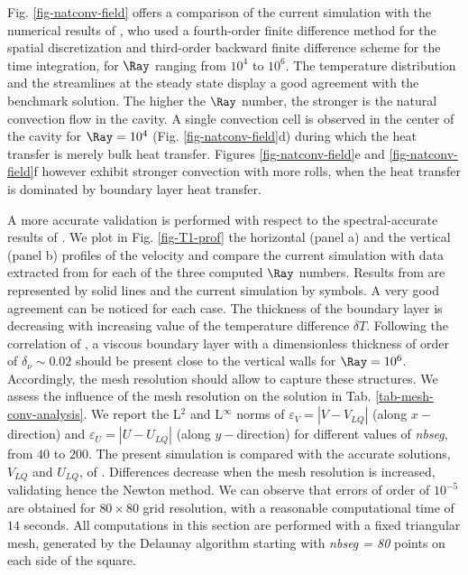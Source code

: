 Fig. \ref{fig-natconv-field} offers a comparison of the current simulation with the numerical results of \cite{Wakashima-2004}, who
used a fourth-order finite difference method for the spatial discretization and third-order backward finite difference scheme for the time integration, for $\Ray$ ranging from $10^4$ to $10^6$.
The temperature distribution and the streamlines at the steady state display a good agreement with the benchmark solution.
The higher the $\Ray$ number, the stronger is the natural convection flow in the cavity.
A single convection cell is observed in the center of the cavity for $\Ray = 10^4$ (Fig. \ref{fig-natconv-field}d) during which the heat transfer is merely bulk heat transfer.
Figures \ref{fig-natconv-field}e and \ref{fig-natconv-field}f however exhibit stronger convection with more rolls, when the heat transfer is dominated by boundary layer heat transfer.

A more accurate validation is performed with respect to the spectral-accurate results of \cite{LeQuere91}.
We plot in Fig. \ref{fig-T1-prof} the horizontal (panel a) and the vertical (panel b)  profiles of the velocity and compare the current simulation with data extracted from  \cite{LeQuere91} for each of the three computed $\Ray$ numbers.
Results from \cite{LeQuere91} are represented by solid lines and the current simulation by symbols.
A very good agreement can  be noticed for each case.
The thickness of the boundary layer is decreasing with increasing value of the temperature difference $\delta T$.
Following the correlation of \cite{bejan2013convection}, a viscous boundary layer with a dimensionless thickness of order of $\delta_\nu \sim 0.02$ should be present close to the vertical walls for $\Ray = 10^6$.
Accordingly, the mesh resolution should allow to capture these structures.
We assess the influence of the mesh resolution on the solution in Tab. \ref{tab-mesh-conv-analysis}. 
We report the L$^2$ and L$^{\infty}$ norms of $\varepsilon_V = |V - V_{LQ}|$ (along $x-$direction)  and $\varepsilon_U = |U - U_{LQ}|$ (along $y-$direction) for different values of {\em nbseg}, from $40$ to $200$. 
The present simulation is compared with the accurate solutions, $V_{LQ}$ and $U_{LQ}$, of \cite{LeQuere91}.
Differences decrease when the mesh resolution is increased, validating hence the Newton method.
We can observe that errors of order of $10^{-5}$ are obtained for $80 \times 80$ grid resolution, with a reasonable computational time of $14$ seconds.
All computations in this section are performed with a fixed triangular mesh, generated by the Delaunay algorithm starting with {\em nbseg = 80} points on each side of the square.


